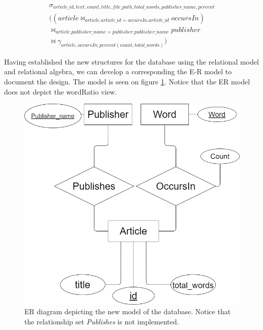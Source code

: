 \begin{equation}\label{create_new_view_rel_alg}
    \begin{split}
        \sigma_{article\_id, text, count,title, file\_path, total\_words, publisher\_name, percent} \\
        ((article \Join_{article.article\_id = occursIn.article\_id} occursIn) \\
        \Join_{article.publisher\_name = publisher.publisher\_name} publisher\\
        \Join \gamma_{article, occursIn;percent(count, total\_words)})
    \end{split}
\end{equation}

Having established the new structures for the database using the relational model and relational algebra, we can develop a corresponding the E-R model to document the design. 
The model is seen on figure \ref{fig:newdatabaseRedesignER}. Notice that the ER model does not depict the wordRatio view.

\begin{figure}[H]
    \centering
    \includegraphics[scale=0.35]{Images/new ER.drawio.png}
    \caption{ER diagram depicting the new model of the database. Notice that the relationship set \textit{Publishes} is not implemented.}
    \label{fig:newdatabaseRedesignER}
\end{figure}